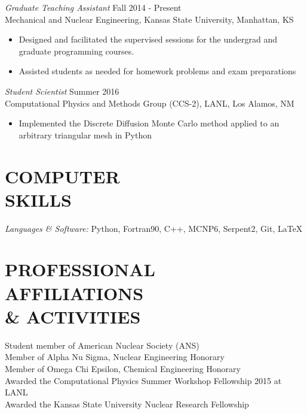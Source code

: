 \documentclass[margin, 10pt]{res} %
\begin{document}
\begin{resume}
{\sl Graduate Teaching Assistant} \hfill Fall 2014 - Present \\
Mechanical and Nuclear Engineering, Kansas State University, Manhattan, KS
\begin{itemize}
\item Designed and facilitated the supervised sessions for the undergrad and graduate programming courses.
\item Assisted students as needed for homework problems and exam preparations
\end{itemize}

{\sl Student Scientist} \hfill Summer 2016 \\
Computational Physics and Methods Group (CCS-2), LANL, Los Alamos, NM
\begin{itemize}
\item Implemented the Discrete Diffusion Monte Carlo method applied to an arbitrary triangular mesh in Python
\end{itemize}

\section{COMPUTER \\ SKILLS}

{\sl Languages \& Software:}
Python, Fortran90, C++, MCNP6, Serpent2, Git, \LaTeX  \\

\section{PROFESSIONAL \\ AFFILIATIONS  \\ \& ACTIVITIES}

Student member of American Nuclear Society (ANS) \\
Member of Alpha Nu Sigma, Nuclear Engineering Honorary \\
Member of Omega Chi Epsilon, Chemical Engineering Honorary\\
Awarded the Computational Physics Summer Workshop Fellowship 2015 at LANL\\
Awarded the Kansas State University Nuclear Research Fellowship

\newpage


\end{resume}
\end{document}
